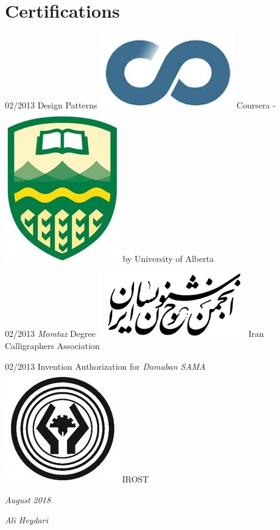 \documentclass[a4paper]{friggeri-cv}
\begin{document}
\section{Certifications}
\begin{entrylist}
  \entry
    {02/2013}
    {Design Patterns}
    {\includegraphics[scale=0.08]{img/Coursera_logo.jpg} Coursera -  \includegraphics[scale=0.05]{img/UAlberta_logo.jpg} by University of Alberta}
    {}

    \entry
     {02/2013}
   {\emph{Momtaz} Degree}
    {\includegraphics[scale=0.1]{img/Khoshnevisan_logo.png} Iran Calligraphers Association}
    {}
    
    \entry
     {02/2013}
   {Invention Authorization for \emph{Damaban SAMA}}
    {\includegraphics[scale=0.09]{img/IROST_logo.jpg} IROST}
    {}
    
\end{entrylist}

\begin{flushleft}
\emph{August  2018}
\end{flushleft}
\begin{flushright}
\emph{Ali Heydari}
\end{flushright}
\end{document}
